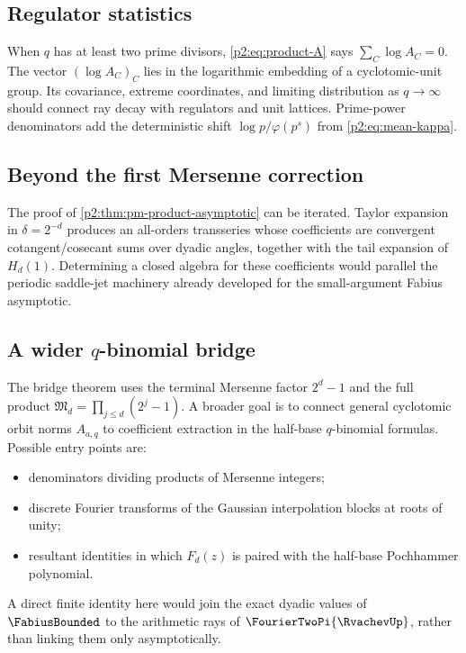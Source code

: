 \documentclass[11pt,oneside]{article}
\theoremstyle{definition}
\theoremstyle{remark}
\begin{document}
\subsection{Regulator statistics}

When $q$ has at least two prime divisors, \eqref{p2:eq:product-A} says
$\sum_C\log A_C=0$. The vector $(\log A_C)_C$ lies in the logarithmic embedding of
a cyclotomic-unit group. Its covariance, extreme coordinates, and limiting
distribution as $q\to\infty$ should connect ray decay with regulators and unit
lattices. Prime-power denominators add the deterministic shift
$\log p/\varphi(p^s)$ from \eqref{p2:eq:mean-kappa}.

\subsection{Beyond the first Mersenne correction}

The proof of \cref{p2:thm:pm-product-asymptotic} can be iterated. Taylor expansion in
$\delta=2^{-d}$ produces an all-orders transseries whose coefficients are convergent
cotangent/cosecant sums over dyadic angles, together with the tail expansion of
$H_d(1)$. Determining a closed algebra for these coefficients would parallel the
periodic saddle-jet machinery already developed for the small-argument Fabius
asymptotic.

\subsection{A wider $q$-binomial bridge}

The bridge theorem uses the terminal Mersenne factor $2^d-1$ and the full product
$\mathfrak M_d=\prod_{j\le d}(2^j-1)$. A broader goal is to connect general
cyclotomic orbit norms $A_{a,q}$ to coefficient extraction in the half-base
$q$-binomial formulas. Possible entry points are:
\begin{itemize}
 \item denominators dividing products of Mersenne integers;
 \item discrete Fourier transforms of the Gaussian interpolation blocks at roots
 of unity;
 \item resultant identities in which $F_d(z)$ is paired with the half-base
 Pochhammer polynomial.
\end{itemize}
A direct finite identity here would join the exact dyadic values of $\FabiusBounded$ to the
arithmetic rays of $\FourierTwoPi{\RvachevUp}$, rather than linking them only asymptotically.
\end{document}
